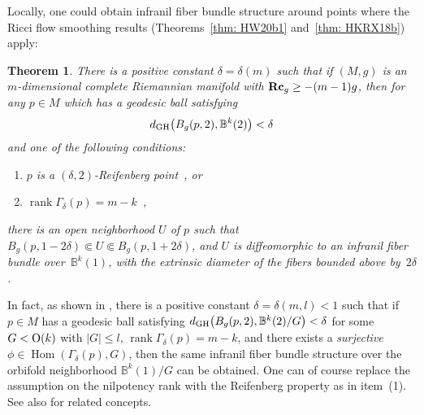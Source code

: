 \documentclass[10pt,a4paper]{amsart}
\numberwithin{equation}{section}
\newtheorem{Theorem}{Theorem}[section]
\newcommand{\Rc}{\operatorname{\bf Rc}}
\newcommand{\rank}{\operatorname{rank}}
\begin{document}
Locally, one could obtain infranil fiber bundle structure around points where
the Ricci flow smoothing results (Theorems~\ref{thm: HW20b1} and~\ref{thm: HKRX18b}) apply:
\begin{Theorem}\label{thm: local_infranil}
There is a positive constant $\delta=\delta(m)$ such that if $(M,g)$ is an
$m$-dimensional complete Riemannian manifold with $\Rc_g\ge -(m-1)g$, then for
any $p\in M$ which has a geodesic ball satisfying
\begin{align*}
d_{\rm GH}\big(B_g(p,2),\mathbb{B}^k(2)\big) < \delta
\end{align*}
and one of the following
conditions:
\begin{enumerate}\itemsep=0pt
 \item[$1)$] $p$ is a $(\delta,2)$-Reifenberg point~{\rm \cite{HKRX18}}, or
 \item[$2)$] $\rank \Gamma_{\delta}(p)=m-k$~{\rm \cite{HW20b}},
\end{enumerate}
there is an open neighborhood $U$ of $p$ such that $B_g(p,1-2\delta )\Subset
U\Subset B_g(p,1+2\delta)$, and $U$ is diffeomorphic to an infranil fiber
bundle over~$\mathbb{B}^k(1)$, with the extrinsic diameter of the fibers
bounded above by~$2\delta$.
\end{Theorem}
\begin{Remark}\label{rmk: orbifold_fibration}
In fact, as shown in \cite[Theorem~1.4]{HW20b}, there is
a positive constant $\delta=\delta(m,l)<1$ such that if $p\in M$ has a geodesic
ball satisfying $d_{\rm GH}\big(B_g(p,2),\mathbb{B}^k(2)\slash G\big) < \delta$
for some $G<{\rm O}(k)$ with $|G|\le l$, $\rank \Gamma_{\delta}(p)=m-k$, and there
exists a \emph{surjective} $\phi \in \operatorname{Hom}(\Gamma_{\delta}(p), G)$, then the same
infranil fiber bundle structure over the orbifold neighborhood
$\mathbb{B}^k(1) \slash G$ can be obtained. One can of course replace the
assumption on the nilpotency rank with the Reifenberg property as in item~(1).
See also \cite[Section~7]{Fukaya89} for related concepts.
\end{Remark}
\end{document}
